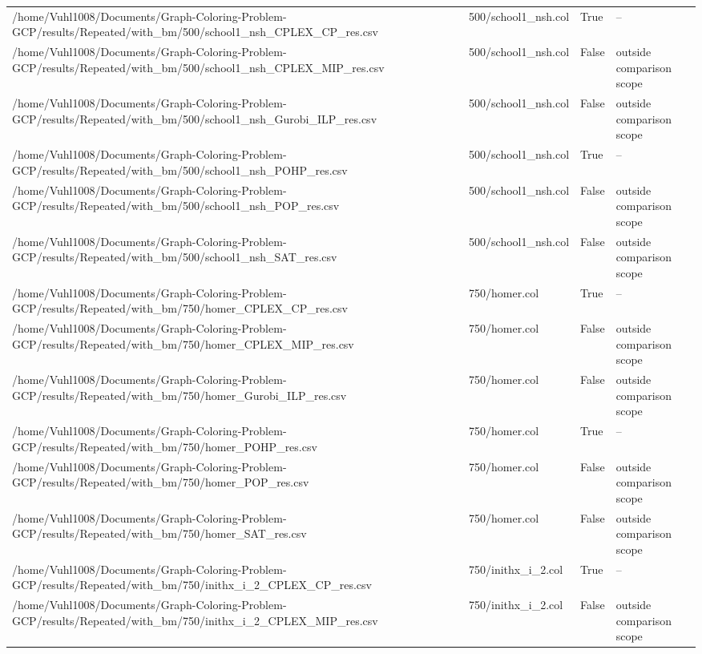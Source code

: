 \begin{table}[htbp]
\begin{tabular}{llll}
/home/Vuhl1008/Documents/Graph-Coloring-Problem-GCP/results/Repeated/with\_bm/500/school1\_nsh\_CPLEX\_CP\_res.csv & 500/school1\_nsh.col & True & -- \\
/home/Vuhl1008/Documents/Graph-Coloring-Problem-GCP/results/Repeated/with\_bm/500/school1\_nsh\_CPLEX\_MIP\_res.csv & 500/school1\_nsh.col & False & outside comparison scope \\
/home/Vuhl1008/Documents/Graph-Coloring-Problem-GCP/results/Repeated/with\_bm/500/school1\_nsh\_Gurobi\_ILP\_res.csv & 500/school1\_nsh.col & False & outside comparison scope \\
/home/Vuhl1008/Documents/Graph-Coloring-Problem-GCP/results/Repeated/with\_bm/500/school1\_nsh\_POHP\_res.csv & 500/school1\_nsh.col & True & -- \\
/home/Vuhl1008/Documents/Graph-Coloring-Problem-GCP/results/Repeated/with\_bm/500/school1\_nsh\_POP\_res.csv & 500/school1\_nsh.col & False & outside comparison scope \\
/home/Vuhl1008/Documents/Graph-Coloring-Problem-GCP/results/Repeated/with\_bm/500/school1\_nsh\_SAT\_res.csv & 500/school1\_nsh.col & False & outside comparison scope \\
/home/Vuhl1008/Documents/Graph-Coloring-Problem-GCP/results/Repeated/with\_bm/750/homer\_CPLEX\_CP\_res.csv & 750/homer.col & True & -- \\
/home/Vuhl1008/Documents/Graph-Coloring-Problem-GCP/results/Repeated/with\_bm/750/homer\_CPLEX\_MIP\_res.csv & 750/homer.col & False & outside comparison scope \\
/home/Vuhl1008/Documents/Graph-Coloring-Problem-GCP/results/Repeated/with\_bm/750/homer\_Gurobi\_ILP\_res.csv & 750/homer.col & False & outside comparison scope \\
/home/Vuhl1008/Documents/Graph-Coloring-Problem-GCP/results/Repeated/with\_bm/750/homer\_POHP\_res.csv & 750/homer.col & True & -- \\
/home/Vuhl1008/Documents/Graph-Coloring-Problem-GCP/results/Repeated/with\_bm/750/homer\_POP\_res.csv & 750/homer.col & False & outside comparison scope \\
/home/Vuhl1008/Documents/Graph-Coloring-Problem-GCP/results/Repeated/with\_bm/750/homer\_SAT\_res.csv & 750/homer.col & False & outside comparison scope \\
/home/Vuhl1008/Documents/Graph-Coloring-Problem-GCP/results/Repeated/with\_bm/750/inithx\_i\_2\_CPLEX\_CP\_res.csv & 750/inithx\_i\_2.col & True & -- \\
/home/Vuhl1008/Documents/Graph-Coloring-Problem-GCP/results/Repeated/with\_bm/750/inithx\_i\_2\_CPLEX\_MIP\_res.csv & 750/inithx\_i\_2.col & False & outside comparison scope \\

\end{tabular}
\end{table}

